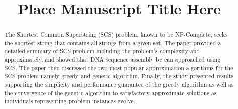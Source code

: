 \documentclass[oneside]{etd}
\title{Place Manuscript Title Here}
\begin{document}
\maketitle
\makerecomm
\makeacceptance
\makedeclaration


\begin{abstract}
	The Shortest Common Superstring (SCS) problem, known to be NP-Complete,	seeks the shortest string that contains all strings from a given set. The paper provided a detailed summary of SCS problem including the problem's complexity and approximately, and showed that DNA sequence assembly be can approached using SCS. The paper then discussed the two most popular approximation algorithms for the SCS problem namely greedy and genetic algorithm. Finally, the study presented results supporting the simplicity and performance guarantee of the greedy algorithm as well as the convergence of the genetic algorithm to satisfactory approximate solutions as individuals representing problem instances evolve.	
\end{abstract}




\begingroup
\renewcommand*{\addvspace}[1]{}
\tableofcontents
\listoffigures
\listoftables
\endgroup

\beginbody
{}








\appendix
    
    
    
    
    

\nocite{*}

{
\singlespace

}


\end{document}
